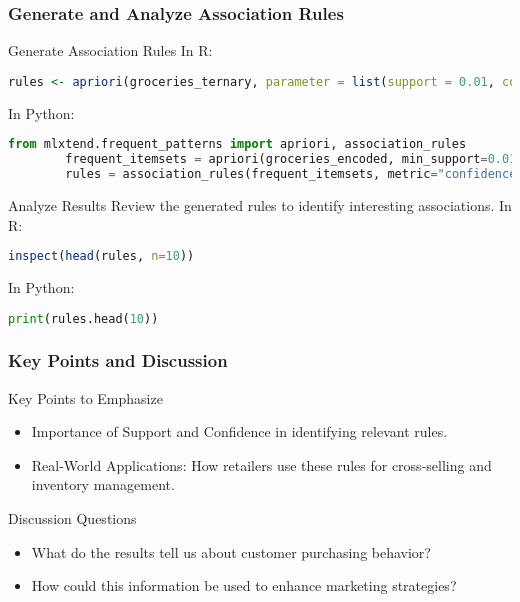 \documentclass[aspectratio=169]{beamer}
\begin{document}
\begin{frame}[fragile]
    \frametitle{Generate and Analyze Association Rules}
    \begin{block}{Generate Association Rules}
        In R:
        \begin{lstlisting}[language=R]
        rules <- apriori(groceries_ternary, parameter = list(support = 0.01, confidence = 0.5))
        \end{lstlisting}
        In Python:
        \begin{lstlisting}[language=Python]
        from mlxtend.frequent_patterns import apriori, association_rules
        frequent_itemsets = apriori(groceries_encoded, min_support=0.01, use_colnames=True)
        rules = association_rules(frequent_itemsets, metric="confidence", min_threshold=0.5)
        \end{lstlisting}
    \end{block}

    \begin{block}{Analyze Results}
        Review the generated rules to identify interesting associations. In R:
        \begin{lstlisting}[language=R]
        inspect(head(rules, n=10))
        \end{lstlisting}
        In Python:
        \begin{lstlisting}[language=Python]
        print(rules.head(10))
        \end{lstlisting}
    \end{block}
\end{frame}

\begin{frame}[fragile]
    \frametitle{Key Points and Discussion}
    \begin{block}{Key Points to Emphasize}
        \begin{itemize}
            \item Importance of Support and Confidence in identifying relevant rules.
            \item Real-World Applications: How retailers use these rules for cross-selling and inventory management.
        \end{itemize}
    \end{block}

    \begin{block}{Discussion Questions}
        \begin{itemize}
            \item What do the results tell us about customer purchasing behavior?
            \item How could this information be used to enhance marketing strategies?
        \end{itemize}
    \end{block}
\end{frame}
\end{document}
